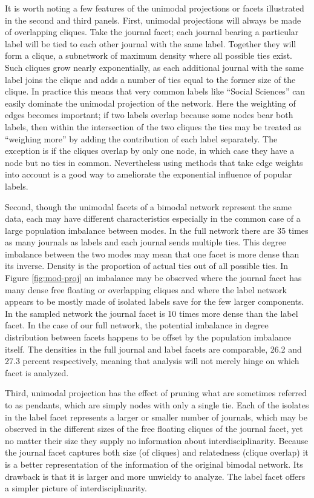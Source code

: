\documentclass[]{book}
\theoremstyle{definition}
\theoremstyle{definition}
\theoremstyle{definition}
\theoremstyle{remark}
\begin{document}
It is worth noting a few features of the unimodal projections or facets
illustrated in the second and third panels. First, unimodal projections
will always be made of overlapping cliques. Take the journal facet; each
journal bearing a particular label will be tied to each other journal
with the same label. Together they will form a clique, a subnetwork of
maximum density where all possible ties exist. Such cliques grow nearly
exponentially, as each additional journal with the same label joins the
clique and adds a number of ties equal to the former size of the clique.
In practice this means that very common labels like ``Social Sciences''
can easily dominate the unimodal projection of the network. Here the
weighting of edges becomes important; if two labels overlap because some
nodes bear both labels, then within the intersection of the two cliques
the ties may be treated as ``weighing more'' by adding the contribution
of each label separately. The exception is if the cliques overlap by
only one node, in which case they have a node but no ties in common.
Nevertheless using methods that take edge weights into account is a good
way to ameliorate the exponential influence of popular labels.

Second, though the unimodal facets of a bimodal network represent the
same data, each may have different characteristics especially in the
common case of a large population imbalance between modes. In the full
network there are 35 times as many journals as labels and each journal
sends multiple ties. This degree imbalance between the two modes may
mean that one facet is more dense than its inverse. Density is the
proportion of actual ties out of all possible ties. In Figure
\ref{fig:mod-proj} an imbalance may be observed where the journal facet
has many dense free floating or overlapping cliques and where the label
network appears to be mostly made of isolated labels save for the few
larger components. In the sampled network the journal facet is 10 times
more dense than the label facet. In the case of our full network, the
potential imbalance in degree distribution between facets happens to be
offset by the population imbalance itself. The densities in the full
journal and label facets are comparable, 26.2 and 27.3 percent
respectively, meaning that analysis will not merely hinge on which facet
is analyzed.

Third, unimodal projection has the effect of pruning what are sometimes
referred to as pendants, which are simply nodes with only a single tie.
Each of the isolates in the label facet represents a larger or smaller
number of journals, which may be observed in the different sizes of the
free floating cliques of the journal facet, yet no matter their size
they supply no information about interdisciplinarity. Because the
journal facet captures both size (of cliques) and relatedness (clique
overlap) it is a better representation of the information of the
original bimodal network. Its drawback is that it is larger and more
unwieldy to analyze. The label facet offers a simpler picture of
interdisciplinarity.
\end{document}
